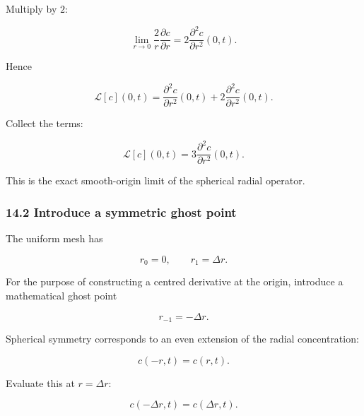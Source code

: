 \documentclass[11pt,a4paper]{article}
\begin{document}
Multiply by $2$:

\begin{equation}
\lim_{r\to0}
\frac2r
\frac{\partial c}{\partial r}
=
2
\frac{\partial^2c}{\partial r^2}(0,t).
\tag{TRISO-DIS-205}
\label{eq:triso-dis-205}
\end{equation}

Hence

\begin{equation}
\mathcal L[c](0,t)
=
\frac{\partial^2c}{\partial r^2}(0,t)
+
2\frac{\partial^2c}{\partial r^2}(0,t).
\tag{TRISO-DIS-206}
\label{eq:triso-dis-206}
\end{equation}

Collect the terms:

\begin{equation}
\boxed{
\mathcal L[c](0,t)
=
3
\frac{\partial^2c}{\partial r^2}(0,t).
}
\tag{TRISO-DIS-207}
\label{eq:triso-dis-207}
\end{equation}

This is the exact smooth-origin limit of the spherical radial operator.

\subsubsection*{14.2 Introduce a symmetric ghost point}

The uniform mesh has

\begin{equation}
r_0=0,
\qquad
r_1=\Delta r.
\tag{TRISO-DIS-208}
\label{eq:triso-dis-208}
\end{equation}

For the purpose of constructing a centred derivative at the origin, introduce a mathematical ghost point

\begin{equation}
r_{-1}=-\Delta r.
\tag{TRISO-DIS-209}
\label{eq:triso-dis-209}
\end{equation}

Spherical symmetry corresponds to an even extension of the radial concentration:

\begin{equation}
c(-r,t)=c(r,t).
\tag{TRISO-DIS-210}
\label{eq:triso-dis-210}
\end{equation}

Evaluate this at $r=\Delta r$:

\begin{equation}
c(-\Delta r,t)=c(\Delta r,t).
\tag{TRISO-DIS-211}
\label{eq:triso-dis-211}
\end{equation}
\end{document}
